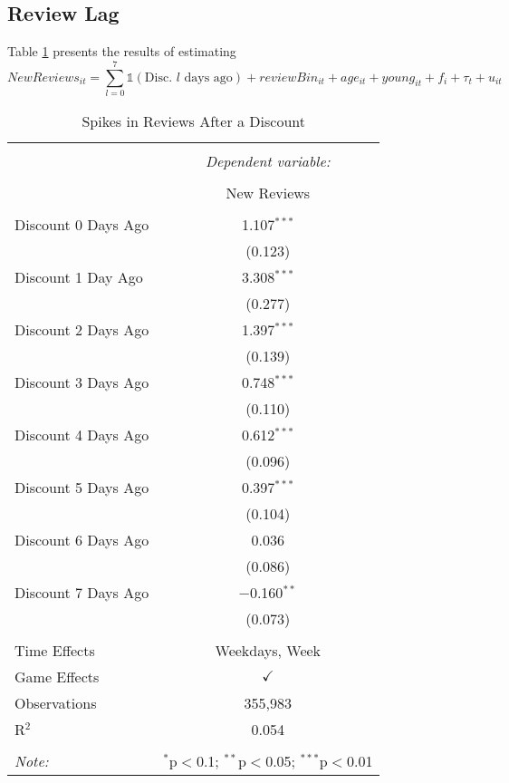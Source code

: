 \documentclass[12pt,pagebackref]{article}
\begin{document}
\newpage

\hypertarget{review-lag}{%
\subsection{Review Lag}\label{review-lag}}

Table \ref{reviewLag} presents the results of estimating
\[NewReviews_{it} =\sum_{l = 0}^{7} \mathds{1}(\text{Disc. } l \text{ days ago})
+ reviewBin_{it} + age_{it} + young_{it} +  f_i + \tau_t + u_{it}\]

\begin{table}[hp] \centering    \caption{Spikes in Reviews After a Discount}    \label{reviewLag}  \begin{tabular}{@{\extracolsep{5pt}}lc}  \\[-1.8ex]\hline  \hline \\[-1.8ex]   & \multicolumn{1}{c}{\textit{Dependent variable:}} \\  \cline{2-2}  \\[-1.8ex] & New Reviews \\  \hline \\[-1.8ex]   Discount 0 Days Ago & 1.107$^{***}$ \\    & (0.123) \\    Discount 1 Day Ago & 3.308$^{***}$ \\    & (0.277) \\    Discount 2 Days Ago & 1.397$^{***}$ \\    & (0.139) \\    Discount 3 Days Ago & 0.748$^{***}$ \\    & (0.110) \\    Discount 4 Days Ago & 0.612$^{***}$ \\    & (0.096) \\    Discount 5 Days Ago & 0.397$^{***}$ \\    & (0.104) \\    Discount 6 Days Ago & 0.036 \\    & (0.086) \\    Discount 7 Days Ago & $-$0.160$^{**}$ \\    & (0.073) \\   \hline \\[-1.8ex]  Time Effects & Weekdays, Week \\ Game Effects & $\checkmark$ \\ Observations & 355,983 \\  R$^{2}$ & 0.054 \\  \hline  \hline \\[-1.8ex]  \textit{Note:}  & \multicolumn{1}{r}{$^{*}$p$<$0.1; $^{**}$p$<$0.05; $^{***}$p$<$0.01} \\  \end{tabular}  \end{table}
\end{document}
